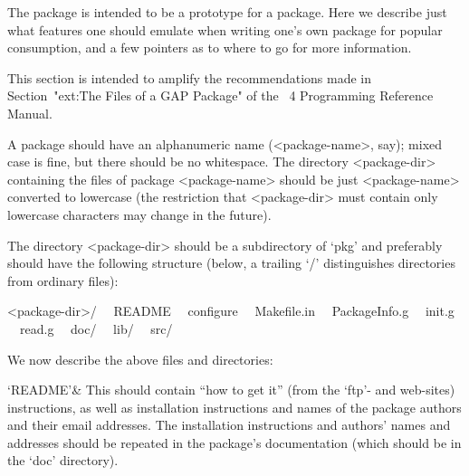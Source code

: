 

The {\Example} package is intended to be a prototype for a package.  Here
we describe just what features one should emulate when writing one's  own
{\GAP} package for popular consumption, and a few pointers as to where to
go for more information.


This  section  is  intended  to  amplify  the  recommendations  made   in
Section~"ext:The Files of a GAP  Package"  of  the  {\GAP}~4  Programming
Reference Manual.

A {\GAP} package should have an alphanumeric name (<package-name>,  say);
mixed case is fine, but there should  be  no  whitespace.  The  directory
<package-dir> containing the files of package  <package-name>  should  be
just  <package-name>  converted  to  lowercase  (the   restriction   that
<package-dir> must contain only lowercase characters may  change  in  the
future).

The directory  <package-dir>  should  be  a  subdirectory  of  `pkg'  and
preferably should have the following structure  (below,  a  trailing  `/'
distinguishes directories from ordinary files):

<package-dir>/
\ \ README
\ \ configure
\ \ Makefile.in
\ \ PackageInfo.g
\ \ init.g
\ \ read.g
\ \ doc/
\ \ lib/
\ \ src/

We now describe the above files and directories:

\beginitems

`README'&
This should contain ``how  to  get  it''  (from  the  {\GAP}  `ftp'-  and
web-sites) instructions, as well as installation instructions  and  names
of the package  authors  and  their  email  addresses.  The  installation
instructions and authors' names and addresses should be repeated  in  the
package's documentation (which should be in the `doc' directory).

